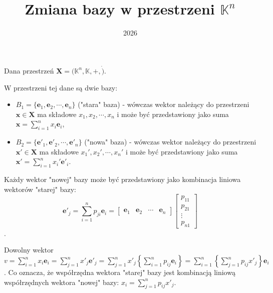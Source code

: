 \documentclass{article}
\title{Zmiana bazy w przestrzeni $\mathbb{K}^{n}$}
\date{2026}
\begin{document}
\maketitle
Dana przestrzeń $\mathbf{X} = (\mathbb{K}^{n}, \mathbb{K}, +, \dot)$.

W przestrzeni tej dane są dwie bazy:
\begin{itemize}
    \item $B_{1} = \{ \mathbf{e}_{1}, \mathbf{e}_{2}, \cdots, \mathbf{e}_{n} \}$ ("stara" baza) - wówczas wektor należący do przestrzeni $\mathbf{x} \in \mathbf{X}$ ma składowe $x_{1}, x_{2}, \cdots, x_{n}$ i może być przedstawiony jako suma $\mathbf{x} = \sum_{i=1}^{n}{x_{i}\mathbf{e}_{i}}$,
    \item $B_{2} = \{ \mathbf{e}'_{1}, \mathbf{e}'_{2}, \cdots, \mathbf{e}'_{n} \}$ ("nowa" baza) - wówczas wektor należący do przestrzeni $\mathbf{x}' \in \mathbf{X}$ ma składowe $x_{1}', x_{2}', \cdots, x_{n}'$ i może być przedstawiony jako suma $\mathbf{x}' = \sum_{i=1}^{n}{x_{i}'\mathbf{e}'_{i}}$.
\end{itemize}

Każdy wektor "nowej" bazy może być przedstawiony jako kombinacja liniowa wektorów "starej" bazy:
$$\mathbf{e}'_{j} = \sum_{i=1}^{n}{p_{ji}\mathbf{e}_{i}} = \begin{bmatrix} \mathbf{e}_{1} & \mathbf{e}_{2} & \cdots & \mathbf{e}_{n} \end{bmatrix} \begin{bmatrix} p_{11} \\ p_{21} \\ \vdots \\ p_{n1} \end{bmatrix}$$.

Dowolny wektor $v = \sum_{i=1}^{n}{x_{i}\mathbf{e}_{i}} = \sum_{j=1}^{n}{x'_{j}\mathbf{e}'_{j}} = \sum_{j=1}^{n}{x'_{j} \left\{ \sum_{i=1}^{n}{p_{ij}\mathbf{e}_{i}}\right\}} = \sum_{i=1}^{n} \left\{ \sum_{j=1}^{n}{p_{ij}x'_{j}} \right\} \mathbf{e}_{i}$.
Co oznacza, że współrzędna wektora "starej" bazy jest kombinacją liniową współrzędnych wektora "nowej" bazy: $x_{i} = \sum_{j=1}^{n}{p_{ij}x'_{j}}$.
\end{document}
